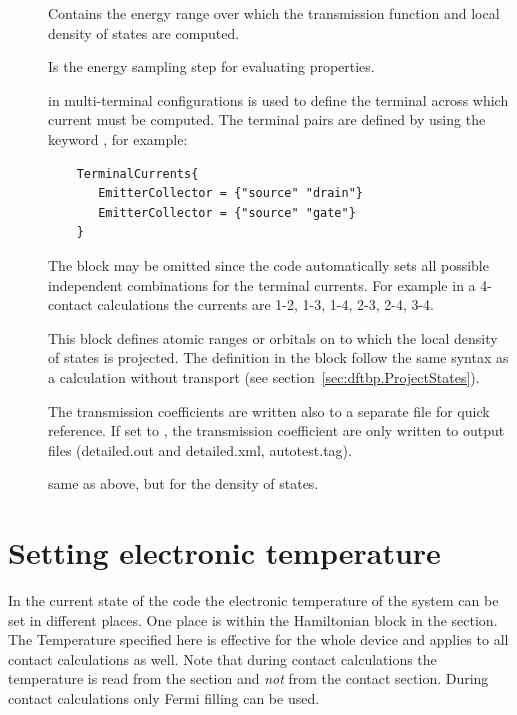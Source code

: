 \begin{description}


\item[] Contains the energy range over
  which the transmission function and local density of states are computed.
\item[] Is the energy sampling step for
  evaluating properties.
\item[] in multi-terminal configurations is used to define
  the terminal across which current must be computed. The terminal pairs are
  defined by using the keyword , for example:
   \begin{verbatim}
    TerminalCurrents{
       EmitterCollector = {"source" "drain"}
       EmitterCollector = {"source" "gate"}
    }
  \end{verbatim}
  The block  may be omitted since the code automatically
  sets all possible independent combinations for the terminal currents. For
  example in a 4-contact calculations the currents are 1-2, 1-3, 1-4, 2-3, 2-4,
  3-4.
\item[] \label{Region} This block defines atomic ranges or orbitals
  on to which the local density of states is projected. The definition in the
  block follow the same syntax as a \dftbp{} calculation without transport (see
  section~\ref{sec:dftbp.ProjectStates}).
\item[] The transmission coefficients are written also to a
  separate file for quick reference. If set to , the transmission
  coefficient are only written to \dftbp{} output files (detailed.out and
  detailed.xml, autotest.tag).
\item[] same as above, but for the density of states.

\end{description}

\section{Setting electronic temperature}

In the current state of the code the electronic temperature of the system can be
set in different places. One place is within the Hamiltonian block in the
 section. The Temperature specified here is effective for the whole
device and applies to all contact calculations as well.  Note that during
contact calculations the temperature is read from the  section and
{\em not} from the contact section.  During contact calculations only Fermi
filling can be used.

